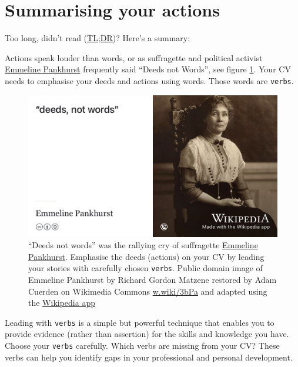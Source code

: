 \documentclass[
]{book}
\begin{document}
\hypertarget{summarising-your-actions}{%
\section{Summarising your actions}\label{summarising-your-actions}}

Too long, didn't read (\href{https://en.wiktionary.org/wiki/too_long;_didn\%27t_read}{TL;DR})? Here's a summary:

Actions speak louder than words, or as suffragette and political activist \href{https://en.wikipedia.org/wiki/Emmeline_Pankhurst}{Emmeline Pankhurst} frequently said ``Deeds not Words'', see figure \ref{fig:pankhurst-fig}. Your CV needs to emphasise your deeds and actions using words. Those words are \texttt{verbs}.

\begin{figure}

{\centering \includegraphics[width=1\linewidth]{images/deeds-not-words-pankhurst} 

}

\caption{``Deeds not words'' was the rallying cry of suffragette \href{https://en.wikipedia.org/wiki/Emmeline_Pankhurst}{Emmeline Pankhurst}. Emphasise the deeds (actions) on your CV by leading your stories with carefully chosen \texttt{verbs}. Public domain image of Emmeline Pankhurst by Richard Gordon Matzene restored by Adam Cuerden on Wikimedia Commons \href{https://w.wiki/3bPa}{w.wiki/3bPa} and adapted using the \href{https://apps.apple.com/gb/app/wikipedia/id324715238}{Wikipedia app}}\label{fig:pankhurst-fig}
\end{figure}



Leading with \texttt{verbs} is a simple but powerful technique that enables you to provide evidence (rather than assertion) for the skills and knowledge you have. Choose your \texttt{verbs} carefully. Which verbs are missing from your CV? These verbs can help you identify gaps in your professional and personal development.
\end{document}
